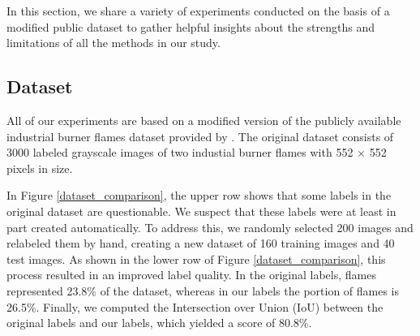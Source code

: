 \documentclass{isprs} %
\begin{document}
In this section, we share a variety of experiments conducted on the basis of a modified public dataset to gather helpful insights about the strengths and limitations of all the methods in our study. 

\subsection{Dataset}
All of our experiments are based on a modified version of the publicly available industrial burner flames dataset provided by \citet{grosskopf2021evaluation}. The original dataset consists of 3000 labeled grayscale images of two industial burner flames with 552 $\times$ 552 pixels in size.

In Figure \ref{dataset_comparison}, the upper row shows that some labels in the original dataset are questionable. We suspect that these labels were at least in part created automatically. To address this, we randomly selected 200 images and relabeled them by hand, creating a new dataset of 160 training images and 40 test images. As shown in the lower row of Figure \ref{dataset_comparison}, this process resulted in an improved label quality. In the original labels, flames represented 23.8\% of the dataset, whereas in our labels the portion of flames is 26.5\%. Finally, we computed the Intersection over Union (IoU) between the original labels and our labels, which yielded a score of 80.8\%.
\end{document}
